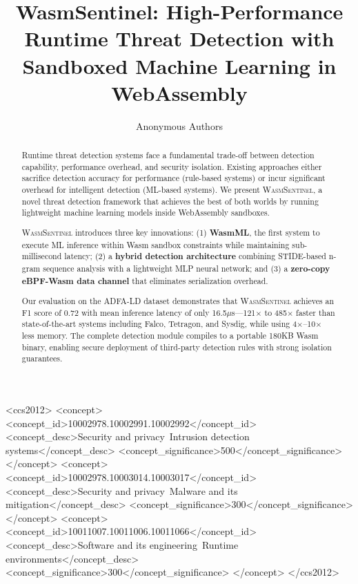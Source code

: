 \documentclass[sigconf,anonymous,review]{acmart}
\begin{document}
\title{WasmSentinel: High-Performance Runtime Threat Detection with \\
Sandboxed Machine Learning in WebAssembly}

\author{Anonymous Authors}

\begin{abstract}
Runtime threat detection systems face a fundamental trade-off between detection capability, performance overhead, and security isolation.
Existing approaches either sacrifice detection accuracy for performance (rule-based systems) or incur significant overhead for intelligent detection (ML-based systems).
We present \textsc{WasmSentinel}, a novel threat detection framework that achieves the best of both worlds by running lightweight machine learning models inside WebAssembly sandboxes.

\textsc{WasmSentinel} introduces three key innovations:
(1) \textbf{WasmML}, the first system to execute ML inference within Wasm sandbox constraints while maintaining sub-millisecond latency;
(2) a \textbf{hybrid detection architecture} combining STIDE-based n-gram sequence analysis with a lightweight MLP neural network;
and (3) a \textbf{zero-copy eBPF-Wasm data channel} that eliminates serialization overhead.

Our evaluation on the ADFA-LD dataset demonstrates that \textsc{WasmSentinel} achieves an F1 score of 0.72 with mean inference latency of only 16.5$\mu$s---121$\times$ to 485$\times$ faster than state-of-the-art systems including Falco, Tetragon, and Sysdig, while using 4$\times$--10$\times$ less memory.
The complete detection module compiles to a portable 180KB Wasm binary, enabling secure deployment of third-party detection rules with strong isolation guarantees.
\end{abstract}

\begin{CCSXML}
<ccs2012>
   <concept>
       <concept_id>10002978.10002991.10002992</concept_id>
       <concept_desc>Security and privacy~Intrusion detection systems</concept_desc>
       <concept_significance>500</concept_significance>
   </concept>
   <concept>
       <concept_id>10002978.10003014.10003017</concept_id>
       <concept_desc>Security and privacy~Malware and its mitigation</concept_desc>
       <concept_significance>300</concept_significance>
   </concept>
   <concept>
       <concept_id>10011007.10011006.10011066</concept_id>
       <concept_desc>Software and its engineering~Runtime environments</concept_desc>
       <concept_significance>300</concept_significance>
   </concept>
</ccs2012>
\end{CCSXML}
\end{document}
